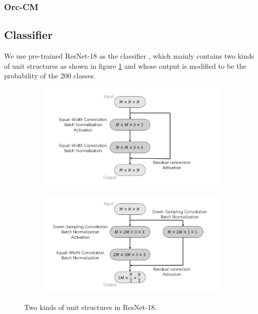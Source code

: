\documentclass{article}
\begin{document}
\subsubsection{Orc-CM}

\subsection{Classifier}

We use pre-trained ResNet-18 as the classifier \citep{ResNet}, which mainly contains two kinds of unit structures as shown in figure \ref{fig:resnet} and whose output is modified to be the probability of the 200 classes.

\begin{figure}[h]
	\centering
	\begin{subfigure}{0.49\textwidth}
		\centering
		\includegraphics[width=\linewidth]
		{../Graph/ResNetI.png}
	\end{subfigure}
	\begin{subfigure}{0.49\textwidth}
		\centering
		\includegraphics[width=\linewidth]
		{../Graph/ResNetII.png}
	\end{subfigure}
	\caption{Two kinds of unit structures in ResNet-18.}
	\label{fig:resnet}
\end{figure}
\end{document}
